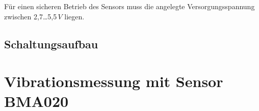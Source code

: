 Für einen sicheren Betrieb des Sensors muss die angelegte Versorgungsspannung zwischen 2,7\dots 5,5\,$V$ liegen.

\subsection{Schaltungsaufbau}
\label{subsection_Schaltungsaufbau_HYT221}










\section{Vibrationsmessung mit Sensor BMA020}
\label{section_BMA020}